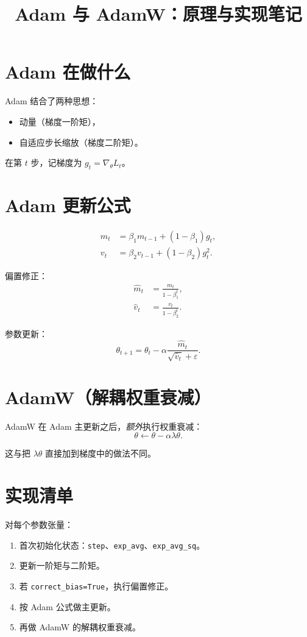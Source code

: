 \documentclass[11pt]{article}
\title{Adam 与 AdamW：原理与实现笔记}
\author{}
\date{}
\begin{document}
\maketitle

\section{Adam 在做什么}
Adam 结合了两种思想：
\begin{itemize}
  \item 动量（梯度一阶矩），
  \item 自适应步长缩放（梯度二阶矩）。
\end{itemize}

在第 $t$ 步，记梯度为 $g_t = \nabla_\theta L_t$。

\section{Adam 更新公式}
\begin{align}
  m_t &= \beta_1 m_{t-1} + (1-\beta_1) g_t, \\
  v_t &= \beta_2 v_{t-1} + (1-\beta_2) g_t^2.
\end{align}

偏置修正：
\begin{align}
  \hat m_t &= \frac{m_t}{1-\beta_1^t}, \\
  \hat v_t &= \frac{v_t}{1-\beta_2^t}.
\end{align}

参数更新：
\begin{equation}
  \theta_{t+1} = \theta_t - \alpha \frac{\hat m_t}{\sqrt{\hat v_t} + \varepsilon}.
\end{equation}

\section{AdamW（解耦权重衰减）}
AdamW 在 Adam 主更新之后，\emph{额外}执行权重衰减：
\begin{equation}
  \theta \leftarrow \theta - \alpha\lambda\theta.
\end{equation}

这与把 $\lambda\theta$ 直接加到梯度中的做法不同。

\section{实现清单}
对每个参数张量：
\begin{enumerate}
  \item 首次初始化状态：\texttt{step}、\texttt{exp\_avg}、\texttt{exp\_avg\_sq}。
  \item 更新一阶矩与二阶矩。
  \item 若 \texttt{correct\_bias=True}，执行偏置修正。
  \item 按 Adam 公式做主更新。
  \item 再做 AdamW 的解耦权重衰减。
\end{enumerate}
\end{document}
